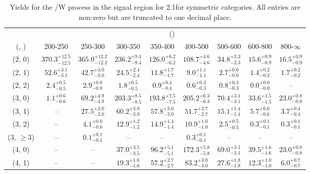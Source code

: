 \begin{table}[h!]
\tiny
\centering
\caption{Yields for the \ttbar/W process in the signal region for 2.1\ifb for symmetric categories. All entries are non-zero but are truncated to one decimal place.\label{tab:yieldssep_sig_ttw_sym}}
\begin{tabular}
{ccccccccc}
	\hline\hline
	& \multicolumn{8}{c}{\scalht (\gev)} \\ 
	 (\njet,  \nb) & 200-250 & 250-300 & 300-350 & 350-400 & 400-500 & 500-600 & 600-800 & 800-$\infty$ \\ [0.8ex] 
\hline
	(2, 0) & $370.3^{+ 12.5 }_{- 12.5 }$ & $365.0^{+ 12.2 }_{- 12.2 }$ & $236.2^{+ 9.4 }_{- 9.4 }$ & $126.0^{+ 6.2 }_{- 6.2 }$ & $108.7^{+ 4.6 }_{- 4.6 }$ & $34.8^{+ 2.3 }_{- 2.3 }$ & $15.6^{+ 0.9 }_{- 0.9 }$ & $16.5^{+ 0.9 }_{- 0.9 }$ \\[0.5ex] 
	(2, 1) & $52.6^{+ 3.1 }_{- 3.1 }$ & $42.7^{+ 3.0 }_{- 3.0 }$ & $24.5^{+ 2.4 }_{- 2.4 }$ & $11.8^{+ 1.7 }_{- 1.7 }$ & $9.0^{+ 1.1 }_{- 1.1 }$ & $2.7^{+ 0.6 }_{- 0.6 }$ & $1.4^{+ 0.2 }_{- 0.2 }$ & $1.7^{+ 0.2 }_{- 0.2 }$ \\[0.5ex] 
	(2, 2) & $2.4^{+ 0.5 }_{- 0.5 }$ & $2.9^{+ 0.8 }_{- 0.8 }$ & $1.8^{+ 0.5 }_{- 0.5 }$ & $0.9^{+ 0.4 }_{- 0.4 }$ & $0.6^{+ 0.3 }_{- 0.3 }$ & $0.8^{+ 0.3 }_{- 0.3 }$ & $0.0^{+ 0.0 }_{- 0.0 }$ & -- \\[0.5ex] 
	(3, 0) & $1.1^{+ 0.6 }_{- 0.6 }$ & $69.2^{+ 4.9 }_{- 4.9 }$ & $203.3^{+ 8.5 }_{- 8.5 }$ & $193.8^{+ 7.5 }_{- 7.5 }$ & $205.2^{+ 6.3 }_{- 6.3 }$ & $70.4^{+ 3.1 }_{- 3.1 }$ & $33.6^{+ 1.5 }_{- 1.5 }$ & $23.0^{+ 0.8 }_{- 0.8 }$ \\[0.5ex] 
	(3, 1) & -- & $27.5^{+ 2.0 }_{- 2.0 }$ & $60.2^{+ 3.0 }_{- 3.0 }$ & $57.8^{+ 3.0 }_{- 3.0 }$ & $51.7^{+ 2.7 }_{- 2.7 }$ & $15.1^{+ 1.4 }_{- 1.4 }$ & $5.7^{+ 0.6 }_{- 0.6 }$ & $3.7^{+ 0.4 }_{- 0.4 }$ \\[0.5ex] 
	(3, 2) & -- & $4.1^{+ 0.6 }_{- 0.6 }$ & $12.9^{+ 1.2 }_{- 1.2 }$ & $14.9^{+ 1.4 }_{- 1.4 }$ & $10.9^{+ 1.0 }_{- 1.0 }$ & $2.5^{+ 0.5 }_{- 0.5 }$ & $0.3^{+ 0.1 }_{- 0.1 }$ & $0.3^{+ 0.1 }_{- 0.1 }$ \\[0.5ex] 
	(3, $\ge3$) & -- & $0.1^{+ 0.1 }_{- 0.1 }$ & -- & -- & $0.3^{+ 0.1 }_{- 0.1 }$ & -- & -- & -- \\[0.5ex] 
	(4, 0) & -- & -- & $37.0^{+ 3.5 }_{- 3.5 }$ & $96.2^{+ 5.1 }_{- 5.1 }$ & $172.3^{+ 5.8 }_{- 5.8 }$ & $69.0^{+ 3.1 }_{- 3.1 }$ & $39.5^{+ 1.6 }_{- 1.6 }$ & $23.0^{+ 0.8 }_{- 0.8 }$ \\[0.5ex] 
	(4, 1) & -- & -- & $19.3^{+ 1.6 }_{- 1.6 }$ & $57.2^{+ 2.7 }_{- 2.7 }$ & $83.2^{+ 3.0 }_{- 3.0 }$ & $27.6^{+ 1.8 }_{- 1.8 }$ & $12.3^{+ 1.0 }_{- 1.0 }$ & $6.0^{+ 0.7 }_{- 0.7 }$ \\[0.5ex] 

\end{tabular}
\end{table}
